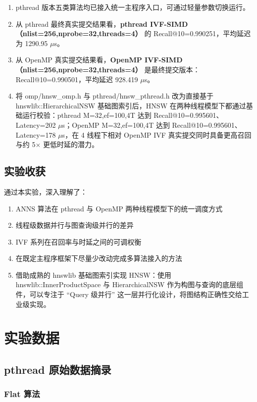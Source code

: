 \documentclass[a4paper]{article}
\begin{document}
\begin{enumerate}
\item pthread 版本五类算法均已接入统一主程序入口，可通过轻量参数切换运行。
\item 从 pthread 最终真实提交结果看，\textbf{pthread IVF-SIMD（nlist=256,nprobe=32,threads=4）} 的 Recall@10=0.990251，平均延迟为 1290.95 $\mu$s。
\item 从 OpenMP 真实提交结果看，\textbf{OpenMP IVF-SIMD（nlist=256,nprobe=32,threads=4）} 是最终提交版本：Recall@10=0.990501，平均延迟 928.419 $\mu$s。
\item 将 omp/hnsw\_omp.h 与 pthread/hnsw\_pthread.h 改为直接基于 hnswlib::HierarchicalNSW 基础图索引后，HNSW 在两种线程模型下都通过基础运行校验：pthread M=32,ef=100,4T 达到 Recall@10=0.995601、Latency=202 $\mu$s；OpenMP M=32,ef=100,4T 达到 Recall@10=0.995601、Latency=178 $\mu$s，在 4 线程下相对 OpenMP IVF 真实提交同时具备更高召回与约 5$\times$ 更低时延的潜力。
\end{enumerate}

\subsection{实验收获}

通过本实验，深入理解了：
\begin{enumerate}
\item ANNS 算法在 pthread 与 OpenMP 两种线程模型下的统一调度方式
\item 线程级数据并行与图查询级并行的差异
\item IVF 系列在召回率与时延之间的可调权衡
\item 在既定主程序框架下尽量少改动完成多算法接入的方法
\item 借助成熟的 hnswlib 基础图索引实现 HNSW：使用 hnswlib::InnerProductSpace 与 HierarchicalNSW 作为构图与查询的底层组件，可以专注于 ``Query 级并行'' 这一层并行化设计，将图结构正确性交给工业级实现。
\end{enumerate}

\appendix
\section{实验数据}

\subsection{pthread 原始数据摘录}

\subsubsection{Flat 算法}
\end{document}
